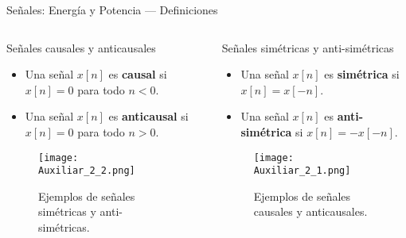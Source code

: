 \documentclass[
    10pt,
    aspectratio=169,
    xcolor={dvipsnames},
    spanish,
    ]{beamer}
\begin{document}
\begin{frame}{Señales: Energía y Potencia — Definiciones}
\begin{columns}[T,onlytextwidth]
  \begin{column}{0.5\textwidth}
    \begin{block}{Señales causales y anticausales}
      \small
      \begin{itemize}
        \item Una señal \(x[n]\) es \textbf{causal} si \(x[n]=0\) para todo \(n<0\).
        \item Una señal \(x[n]\) es \textbf{anticausal} si \(x[n]=0\) para todo \(n>0\).
      \end{itemize}
    \end{block}
    \begin{figure}
      \centering
      \texttt{[image: Auxiliar\_2\_2.png]}
      \caption{Ejemplos de señales simétricas y anti-simétricas.}
    \end{figure}
  \end{column}
  \begin{column}{0.45\textwidth}
    \begin{block}{Señales simétricas y anti-simétricas}
      \small
      \begin{itemize}
        \item Una señal \(x[n]\) es \textbf{simétrica} si \(x[n] = x[-n]\).
        \item Una señal \(x[n]\) es \textbf{anti-simétrica} si \(x[n] = -x[-n]\).
      \end{itemize}
    \end{block}
    \begin{figure}
      \centering
      \texttt{[image: Auxiliar\_2\_1.png]}
      \caption{Ejemplos de señales causales y anticausales.}
    \end{figure}
  \end{column}
\end{columns}

\end{frame}
\end{document}
